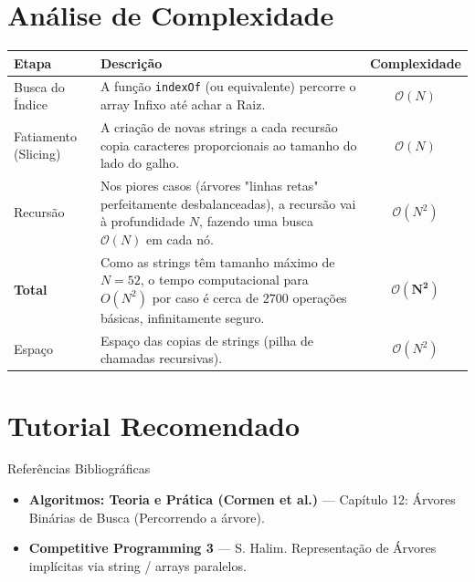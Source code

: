 \documentclass[11pt,a4paper]{article}
\begin{document}
\section{Análise de Complexidade}
\begin{center}
\begin{tabularx}{0.85\textwidth}{l X c}
\toprule
\textbf{Etapa} & \textbf{Descrição} & \textbf{Complexidade} \\
\midrule
Busca do Índice & A função \texttt{indexOf} (ou equivalente) percorre o array Infixo até achar a Raiz. & $\mathcal{O}(N)$ \\
Fatiamento (Slicing) & A criação de novas strings a cada recursão copia caracteres proporcionais ao tamanho do lado do galho. & $\mathcal{O}(N)$ \\
Recursão & Nos piores casos (árvores "linhas retas" perfeitamente desbalanceadas), a recursão vai à profundidade $N$, fazendo uma busca $\mathcal{O}(N)$ em cada nó. & $\mathcal{O}(N^2)$ \\
\midrule
\textbf{Total} & Como as strings têm tamanho máximo de $N = 52$, o tempo computacional para $O(N^2)$ por caso é cerca de $2700$ operações básicas, infinitamente seguro. & $\mathbf{\mathcal{O}(N^2)}$ \\
Espaço & Espaço das copias de strings (pilha de chamadas recursivas). & $\mathcal{O}(N^2)$ \\
\bottomrule
\end{tabularx}
\end{center}

\section{Tutorial Recomendado}
\begin{notebox}{Referências Bibliográficas}
\begin{itemize}
  \item \textbf{Algoritmos: Teoria e Prática (Cormen et al.)} --- Capítulo 12: Árvores Binárias de Busca (Percorrendo a árvore).
  \item \textbf{Competitive Programming 3} --- S. Halim. Representação de Árvores implícitas via string / arrays paralelos.
\end{itemize}
\end{notebox}

\end{document}
